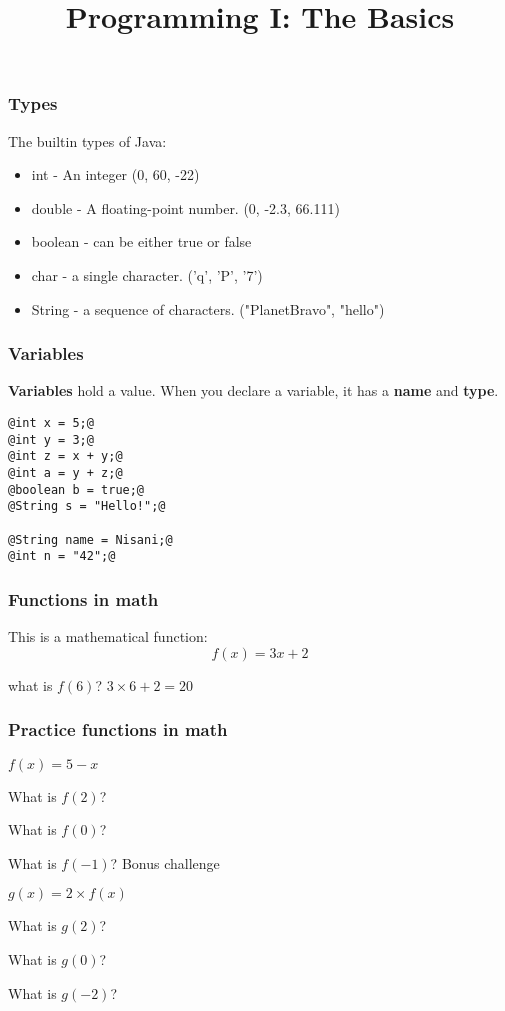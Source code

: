\documentclass{beamer}
\title{Programming I: The Basics}
\date{}
\begin{document}
\frame{\titlepage}

\begin{frame}
\frametitle{Types}
The builtin types of Java:
\pause
\begin{itemize}
\item int - An integer (0, 60, -22)
\pause
\item double - A floating-point number. (0, -2.3, 66.111)
\pause
\item boolean - can be either true or false
\pause
\item char - a single character. ('q', 'P', '7')
\pause
\item String - a sequence of characters. ("PlanetBravo", "hello")
\end{itemize}
\end{frame}

\begin{frame}[fragile]
\frametitle{Variables}
\textbf{Variables} hold a value. When you declare a variable, it has a \textbf{name} and \textbf{type}.
\pause
{}
\begin{lstlisting}[style=base]
@int x = 5;@
@int y = 3;@
@int z = x + y;@
@int a = y + z;@
@boolean b = true;@
@String s = "Hello!";@

@String name = Nisani;@
@int n = "42";@
\end{lstlisting}
\end{frame}

\begin{frame}
\frametitle{Functions in math}
This is a mathematical function:
$$f(x)=3x+2$$

\pause
what is $f(6)$?
\pause
$3\times6 + 2 = 20$

\end{frame}

\begin{frame}
\frametitle{Practice functions in math}
$f(x)=5-x$

What is $f(2)$?
\pause

What is $f(0)$?
\pause

What is $f(-1)$?
\pause
\newline
\newline
Bonus challenge

$g(x)=2 \times f(x)$

What is $g(2)$?
\pause

What is $g(0)$?
\pause

What is $g(-2)$?
\end{frame}
\end{document}
